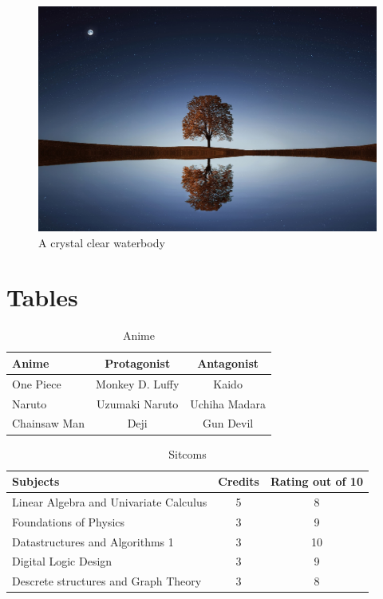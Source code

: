 \documentclass{article}
\begin{document}
\begin{figure}

  \includegraphics[width=\linewidth]{scenary1.jpg}
  \caption{A crystal clear waterbody}
  \label{fig:Scenary}
\end{figure}

\pagebreak 

\section{Tables}
\begin{table}[h!]
\begin{center}
\caption{Anime}
\label{tab:Table1}
\vspace{10mm}
\begin{tabular}{|l|c|c|}
\hline
\textbf{Anime} &\textbf{Protagonist} &\textbf{Antagonist}\\
\hline
One Piece & Monkey D. Luffy & Kaido\\
Naruto & Uzumaki Naruto& Uchiha Madara\\
Chainsaw Man & Deji & Gun Devil\\
\hline
\end{tabular}
\end{center}
\end{table}
\vspace{40mm}

\begin{table}[!ht]
\begin{center}
\caption{Sitcoms}
\label{tab:Table2}
\vspace{10mm}
\begin{tabular}{|l|c|c|}
\hline
\textbf{Subjects} &\textbf{Credits} &\textbf{Rating out of 10}\\
\hline
Linear Algebra and Univariate Calculus & 5 & 8\\
\hline
Foundations of Physics & 3 & 9\\
\hline
Datastructures and Algorithms 1 & 3 & 10\\
\hline
Digital Logic Design & 3 & 9\\
\hline
Descrete structures and Graph Theory & 3 & 8\\
\hline
\end{tabular}
\end{center}
\end{table}
\end{document}
